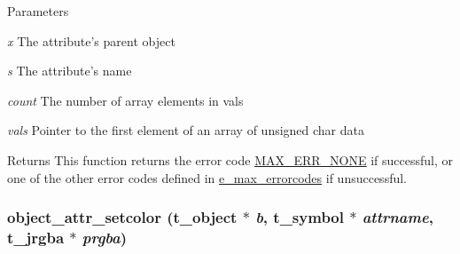 \begin{DoxyParams}{Parameters}
\item[{\em x}]The attribute's parent object \item[{\em s}]The attribute's name \item[{\em count}]The number of array elements in vals \item[{\em vals}]Pointer to the first element of an array of unsigned char data\end{DoxyParams}
\begin{DoxyReturn}{Returns}
This function returns the error code \hyperlink{group__misc_gga0764dd6c02b76cca7d053ae50555d69da6d22f77fef8b1e1b074cef5d29d935fd}{MAX\_\-ERR\_\-NONE} if successful, or one of the other error codes defined in \hyperlink{group__misc_ga0764dd6c02b76cca7d053ae50555d69d}{e\_\-max\_\-errorcodes} if unsuccessful. 
\end{DoxyReturn}
\hypertarget{group__attr_ga0c2653841473eb38b27c994dfde5afdf}{
\subsubsection[{object\_\-attr\_\-setcolor}]{ object\_\-attr\_\-setcolor ({\bf t\_\-object} $\ast$ {\em b}, \/  {\bf t\_\-symbol} $\ast$ {\em attrname}, \/  {\bf t\_\-jrgba} $\ast$ {\em prgba})}}
\label{group__attr_ga0c2653841473eb38b27c994dfde5afdf}


